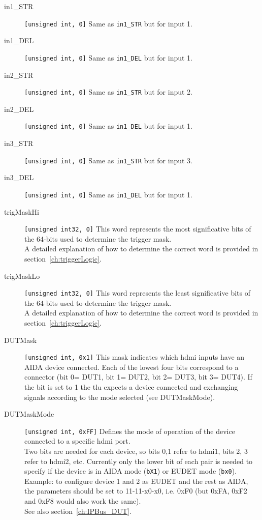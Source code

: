 \begin{description}
  \item[in1\_STR] \verb|[unsigned int, 0]| Same as \texttt{in1\_STR} but for input 1.
  \item[in1\_DEL] \verb|[unsigned int, 0]| Same as \texttt{in1\_DEL} but for input 1.
  \item[in2\_STR] \verb|[unsigned int, 0]| Same as \texttt{in1\_STR} but for input 2.
  \item[in2\_DEL] \verb|[unsigned int, 0]| Same as \texttt{in1\_DEL} but for input 1.
  \item[in3\_STR] \verb|[unsigned int, 0]| Same as \texttt{in1\_STR} but for input 3.
  \item[in3\_DEL] \verb|[unsigned int, 0]| Same as \texttt{in1\_DEL} but for input 1.
  \item[trigMaskHi] \verb|[unsigned int32, 0]| This word represents the most significative bits of the 64-bits used to determine the trigger mask.\\
        A detailed explanation of how to determine the correct word is provided in section~\ref{ch:triggerLogic}.
  \item[trigMaskLo] \verb|[unsigned int32, 0]| This word represents the least significative bits of the 64-bits used to determine the trigger mask.\\
        A detailed explanation of how to determine the correct word is provided in section~\ref{ch:triggerLogic}.
  \item[DUTMask]  \verb|[unsigned int, 0x1]| This mask indicates which \gls{hdmi} inputs have an AIDA device connected. Each of the lowest four bits correspond to a connector (bit 0= DUT1, bit 1= DUT2, bit 2= DUT3, bit 3= DUT4). If the bit is set to 1 the \gls{tlu} expects a device connected and exchanging signals according to the mode selected (see DUTMaskMode).
  \item[DUTMaskMode]  \verb|[unsigned int, 0xFF]| Defines the mode of operation of the device connected to a specific \gls{hdmi} port.\\
        Two bits are needed for each device, so bits 0,1 refer to \gls{hdmi}1, bits 2, 3 refer to \gls{hdmi}2, etc. Currently only the lower bit of each pair is needed to specify if the device is in AIDA mode (\texttt{bX1}) or EUDET mode (\texttt{bx0}).\\
        Example: to configure device 1 and 2 as EUDET and the rest as AIDA, the parameters should be set to 11-11-x0-x0, i.e. 0xF0 (but 0xFA, 0xF2 and 0xF8 would also work the same).\\
        See also section~\ref{ch:IPBus_DUT}.

\end{description}

